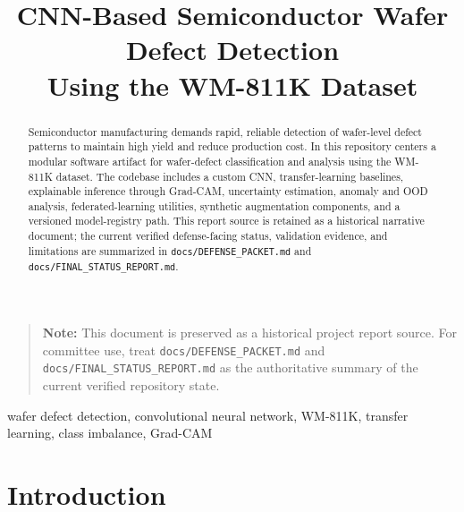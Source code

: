 \documentclass[conference]{IEEEtran}
\begin{document}
\title{CNN-Based Semiconductor Wafer Defect Detection\\Using the WM-811K Dataset}

\author{
}

\maketitle

\begin{abstract}
Semiconductor manufacturing demands rapid, reliable detection of wafer-level
defect patterns to maintain high yield and reduce production cost. In this
repository centers a modular software artifact for wafer-defect classification
and analysis using the WM-811K dataset. The codebase includes a custom CNN,
transfer-learning baselines, explainable inference through Grad-CAM,
uncertainty estimation, anomaly and OOD analysis, federated-learning utilities,
synthetic augmentation components, and a versioned model-registry path. This
report source is retained as a historical narrative document; the current
verified defense-facing status, validation evidence, and limitations are
summarized in \texttt{docs/DEFENSE\_PACKET.md} and
\texttt{docs/FINAL\_STATUS\_REPORT.md}.
\end{abstract}

\begin{quote}
\small
\textbf{Note:} This document is preserved as a historical project report source.
For committee use, treat \texttt{docs/DEFENSE\_PACKET.md} and
\texttt{docs/FINAL\_STATUS\_REPORT.md} as the authoritative summary of the
current verified repository state.
\end{quote}

\begin{IEEEkeywords}
wafer defect detection, convolutional neural network, WM-811K, transfer
learning, class imbalance, Grad-CAM
\end{IEEEkeywords}

\section{Introduction}
\label{sec:introduction}
\end{document}
